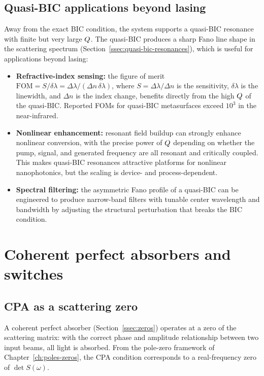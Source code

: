 \subsection{Quasi-BIC applications beyond lasing}
\label{ssec:quasi-bic-apps}

Away from the exact BIC condition, the system supports a quasi-BIC
resonance with finite but very large $Q$. The quasi-BIC produces
a sharp Fano line shape in the scattering spectrum
(Section~\ref{ssec:quasi-bic-resonances}), which is useful for applications beyond
lasing:
\begin{itemize}
 \item \textbf{Refractive-index sensing:} the figure of merit
 $\mathrm{FOM}=S/\delta\lambda
 = \Delta\lambda/(\Delta n\,\delta\lambda)$,
 where $S=\Delta\lambda/\Delta n$ is the sensitivity,
 $\delta\lambda$ is the linewidth, and $\Delta n$ is the index change, benefits
 directly from the high $Q$ of the quasi-BIC. Reported FOMs
 for quasi-BIC metasurfaces exceed $10^3$ in the near-infrared.
 \item \textbf{Nonlinear enhancement:} resonant field buildup can
 strongly enhance nonlinear conversion, with the precise power of
 $Q$ depending on whether the pump, signal, and generated frequency
 are all resonant and critically coupled. This makes quasi-BIC
 resonances attractive platforms for nonlinear nanophotonics, but the
 scaling is device- and process-dependent.
 \item \textbf{Spectral filtering:} the asymmetric Fano profile of a
 quasi-BIC can be engineered to produce narrow-band filters with
 tunable center wavelength and bandwidth by adjusting the structural
 perturbation that breaks the BIC condition.
\end{itemize}


\section{Coherent perfect absorbers and switches}
\label{sec:cpa-devices}

\subsection{CPA as a scattering zero}
\label{ssec:cpa-switch}

A coherent perfect absorber (Section~\ref{ssec:zeros}) operates at a zero
of the scattering matrix: with the correct phase and amplitude
relationship between two input beams, all light is absorbed. From the
pole-zero framework of Chapter~\ref{ch:poles-zeros}, the CPA condition
corresponds to a real-frequency zero of $\det S(\omega)$.

